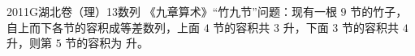 
\begin{problem}{2011}{G}{湖北卷（理）}{13}{数列}
《九章算术》“竹九节”问题：现有一根 $9$ 节的竹子，自上而下各节的容积成等差数列，上面 $4$ 节的容积共 $3$ 升，下面 $3$ 节的容积共 $4$ 升，则第 $5$ 节的容积为 \underline{\hspace{4em}} 升。
\end{problem}

\begin{answer}

\end{answer}

\begin{solutions}

\end{solutions}